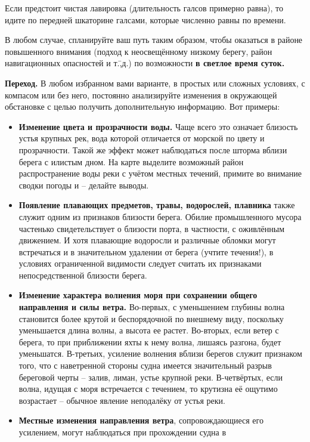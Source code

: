 Если предстоит чистая лавировка (длительность галсов примерно равна),
то идите по передней шкаторине галсами, которые численно равны по
времени.

В любом случае, спланируйте ваш путь таким образом, чтобы оказаться в
районе повышенного внимания (подход к неосвещённому низкому берегу,
район навигационных опасностей и т.\=,д.) по возможности \textbf{в
  светлое время суток.}

\textbf{Переход.} В любом избранном вами варианте, в простых или
сложных условиях, с компасом или без него, постоянно анализируйте
изменения в окружающей обстановке с целью получить дополнительную
информацию. Вот примеры:

\begin{itemize} 
\item \textbf{Изменение цвета и прозрачности воды.} Чаще всего это
  означает близость устья крупных рек, вода которой отличается от
  морской по цвету и прозрачности. Такой же эффект может наблюдаться
  после шторма вблизи берега с илистым дном. На карте выделите
  возможный район распространение воды реки с учётом местных течений,
  примите во внимание сводки погоды и \--- делайте выводы.
\item \textbf{Появление плавающих предметов, травы, водорослей,
    плавника} также служит одним из признаков близости берега. Обилие
  промышленного мусора частенько свидетельствует о близости порта, в
  частности, с оживлённым движением. И хотя плавающие водоросли и
  различные обломки могут встречаться и в значительном удалении от
  берега (учтите течения!), в условиях ограниченной видимости следует
  считать их признаками непосредственной близости берега.
\item \textbf{Изменение характера волнения моря при сохранении общего
    направления и силы ветра.} Во-первых, с уменьшением глубины волна
  становится более крутой и беспорядочной по внешнему виду, поскольку
  уменьшается длина волны, а высота ее растет. Во-вторых, если ветер с
  берега, то при приближении яхты к нему волна, лишаясь разгона, будет
  уменьшатся. В-третьих, усиление волнения вблизи берегов служит
  признаком того, что с наветренной стороны судна имеется значительный
  разрыв береговой черты \--- залив, лиман, устье крупной
  реки. В-четвёртых, если волна, идущая с моря встречается с течением,
  то крутизна её ощутимо возрастает \--- обычное явление неподалёку от
  устья реки.
\item \textbf{Местные изменения направления ветра}, сопровождающиеся
  его усилением, могут наблюдаться при прохождении судна в

\end{itemize}
